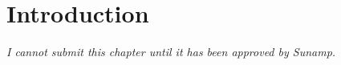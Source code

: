 \chapter{Introduction} %

\label{Chapter1} %


\emph{I cannot submit this chapter until it has been approved by Sunamp.}